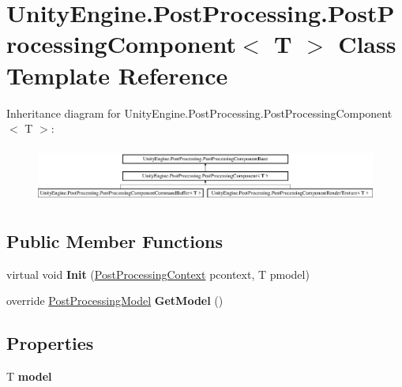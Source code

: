 \hypertarget{class_unity_engine_1_1_post_processing_1_1_post_processing_component}{}\section{Unity\+Engine.\+Post\+Processing.\+Post\+Processing\+Component$<$ T $>$ Class Template Reference}
\label{class_unity_engine_1_1_post_processing_1_1_post_processing_component}
Inheritance diagram for Unity\+Engine.\+Post\+Processing.\+Post\+Processing\+Component$<$ T $>$\+:\begin{figure}[H]
\begin{center}
\leavevmode
\includegraphics[height=1.854305cm]{class_unity_engine_1_1_post_processing_1_1_post_processing_component}
\end{center}
\end{figure}
\subsection*{Public Member Functions}
\begin{DoxyCompactItemize}
\item 
\mbox{\label{class_unity_engine_1_1_post_processing_1_1_post_processing_component_a982348916489395b61300b2ed37784a3}} 
virtual void {\bfseries Init} (\mbox{\hyperlink{class_unity_engine_1_1_post_processing_1_1_post_processing_context}{Post\+Processing\+Context}} pcontext, T pmodel)
\item 
\mbox{\label{class_unity_engine_1_1_post_processing_1_1_post_processing_component_ac946ffb514e0ebb0141e87777459ffc9}} 
override \mbox{\hyperlink{class_unity_engine_1_1_post_processing_1_1_post_processing_model}{Post\+Processing\+Model}} {\bfseries Get\+Model} ()
\end{DoxyCompactItemize}
\subsection*{Properties}
\begin{DoxyCompactItemize}
\item 
\mbox{\label{class_unity_engine_1_1_post_processing_1_1_post_processing_component_a7af78d4436d104b01373d1bf0f7bcedf}} 
T {\bfseries model}
\end{DoxyCompactItemize}

